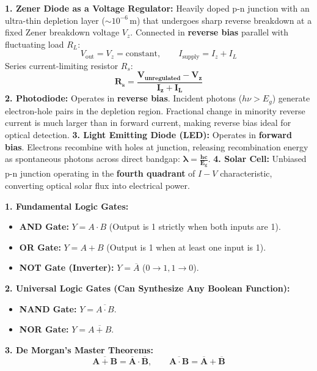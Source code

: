 \documentclass[10pt,a4paper]{article}
\begin{document}
\begin{formulabox}
\textbf{1. Zener Diode as a Voltage Regulator:}
Heavily doped p-n junction with an ultra-thin depletion layer ($\sim 10^{-6}\,\mathrm{m}$) that undergoes sharp reverse breakdown at a fixed Zener breakdown voltage $V_z$.
Connected in \textbf{reverse bias} parallel with fluctuating load $R_L$:
\begin{equation}
  V_{\text{out}} = V_z = \text{constant}, \qquad I_{\text{supply}} = I_z + I_L
\end{equation}
Series current-limiting resistor $R_s$:
\begin{equation}
  \mathbf{R_s = \frac{V_{\text{unregulated}} - V_z}{I_z + I_L}}
\end{equation}
\textbf{2. Photodiode:} Operates in \textbf{reverse bias}. Incident photons ($h\nu > E_g$) generate electron-hole pairs in the depletion region. Fractional change in minority reverse current is much larger than in forward current, making reverse bias ideal for optical detection.
\textbf{3. Light Emitting Diode (LED):} Operates in \textbf{forward bias}. Electrons recombine with holes at junction, releasing recombination energy as spontaneous photons across direct bandgap: $\mathbf{\lambda = \frac{hc}{E_g}}$.
\textbf{4. Solar Cell:} Unbiased p-n junction operating in the \textbf{fourth quadrant} of $I-V$ characteristic, converting optical solar flux into electrical power.
\end{formulabox}

\begin{formulabox}
\textbf{1. Fundamental Logic Gates:}
\begin{itemize}
  \item \textbf{AND Gate:} $Y = A \cdot B$ (Output is 1 strictly when both inputs are 1).
  \item \textbf{OR Gate:} $Y = A + B$ (Output is 1 when at least one input is 1).
  \item \textbf{NOT Gate (Inverter):} $Y = \overline{A}$ ($0 \to 1, 1 \to 0$).
\end{itemize}
\textbf{2. Universal Logic Gates (Can Synthesize Any Boolean Function):}
\begin{itemize}
  \item \textbf{NAND Gate:} $Y = \overline{A \cdot B}$.
  \item \textbf{NOR Gate:} $Y = \overline{A + B}$.
\end{itemize}
\textbf{3. De Morgan's Master Theorems:}
\begin{equation}
  \mathbf{\overline{A + B} = \overline{A} \cdot \overline{B}}, \qquad \mathbf{\overline{A \cdot B} = \overline{A} + \overline{B}}
\end{equation}
\end{formulabox}
\end{document}
